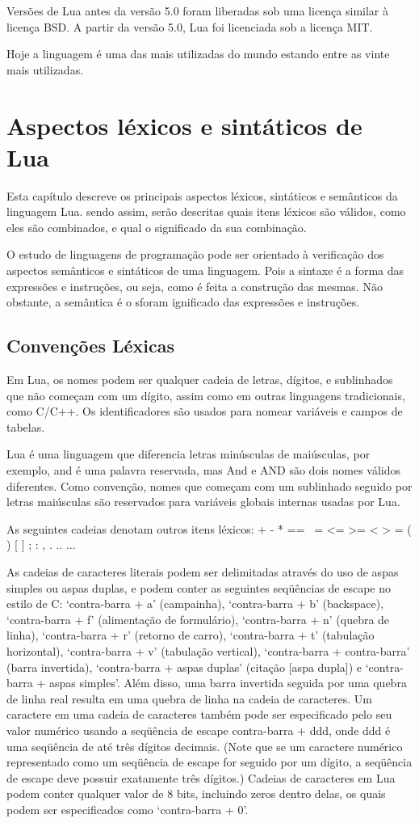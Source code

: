 \documentclass[
12pt, %
openright, %
oneside, %
a4paper, %
english, %
brazil, %
]{abntex2}
\begin{document}
Versões de Lua antes da versão 5.0 foram liberadas sob uma licença similar à licença BSD. A partir da versão 5.0, Lua foi licenciada sob a licença MIT.

Hoje a linguagem é uma das mais utilizadas do mundo estando entre as vinte mais utilizadas.

\chapter{Aspectos léxicos e sintáticos de Lua}
Esta capítulo descreve os principais aspectos léxicos, sintáticos e semânticos da linguagem Lua. sendo assim, serão descritas quais itens léxicos são válidos, como eles são combinados, e qual o significado da sua combinação.

O estudo de linguagens de programação pode ser orientado à verificação dos aspectos semânticos e sintáticos de uma linguagem. Pois a sintaxe é a forma das expressões e instruções, ou seja, como é feita a construção das mesmas. Não obstante, a semântica é o sforam ignificado das expressões e instruções.

\section{Convenções Léxicas}
Em Lua, os nomes podem ser qualquer cadeia de letras, dígitos, e sublinhados que não começam com um dígito, assim como em outras linguagens tradicionais, como C/C++. Os identificadores são usados para nomear variáveis e campos de tabelas.

Lua é uma linguagem que diferencia letras minúsculas de maiúsculas, por exemplo, and é uma palavra reservada, mas And e AND são dois nomes válidos diferentes. Como convenção, nomes que começam com um sublinhado seguido por letras maiúsculas são reservados para variáveis globais internas usadas por Lua.

As seguintes cadeias denotam outros itens léxicos:
+ - * == ~= <= >= < > = ( ) { } [ ] ; : , . .. ...

As cadeias de caracteres literais podem ser delimitadas através do uso de aspas simples ou aspas duplas, e podem conter as seguintes seqüências de escape no estilo de C: `contra-barra + a' (campainha), `contra-barra + b' (backspace), `contra-barra + f' (alimentação de formulário), `contra-barra + n' (quebra de linha), `contra-barra + r' (retorno de carro), `contra-barra + t' (tabulação horizontal), `contra-barra + v' (tabulação vertical), `contra-barra + contra-barra' (barra invertida), `contra-barra + aspas duplas' (citação [aspa dupla]) e `contra-barra + aspas simples'. Além disso, uma barra invertida seguida por uma quebra de linha real resulta em uma quebra de linha na cadeia de caracteres. Um caractere em uma cadeia de caracteres também pode ser especificado pelo seu valor numérico usando a seqüência de escape contra-barra + ddd, onde ddd é uma seqüência de até três dígitos decimais. (Note que se um caractere numérico representado como um seqüência de escape for seguido por um dígito, a seqüência de escape deve possuir exatamente três dígitos.) Cadeias de caracteres em Lua podem conter qualquer valor de 8 bits, incluindo zeros dentro delas, os quais podem ser especificados como `contra-barra + 0'.
\end{document}

